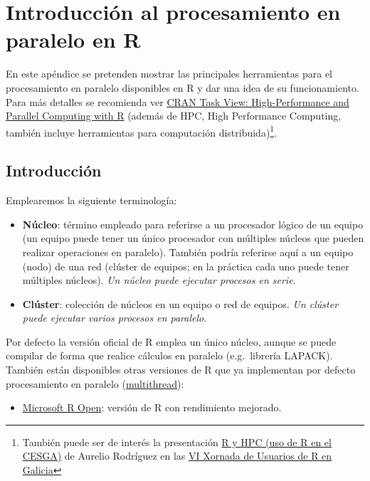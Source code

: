 \documentclass[
]{book}
\providecommand{\tightlist}{%
  \setlength{\itemsep}{0pt}\setlength{\parskip}{0pt}}
\theoremstyle{break}
\theoremstyle{nonumberplain}
\let\oldfootnote\footnote
\renewcommand\footnote[1]{\oldfootnote{\hspace{2mm}#1}}
\begin{document}
\chapter{Introducción al procesamiento en paralelo en R}\label{intro-hpc}

En este apéndice se pretenden mostrar las principales herramientas para el procesamiento en paralelo disponibles en R y dar una idea de su funcionamiento.
Para más detalles se recomienda ver \href{https://cran.r-project.org/view=HighPerformanceComputing}{CRAN Task View: High-Performance and Parallel Computing with R}
(además de HPC, High Performance Computing, también incluye herramientas
para computación distribuida)\footnote{También puede ser de interés la presentación \href{https://www.r-users.gal/sites/default/files/10_aurelio_rodriguez.pdf}{R y HPC (uso de R en el CESGA)} de Aurelio Rodríguez en las \href{https://www.r-users.gal/pagina/programa-2018}{VI Xornada de Usuarios de R en Galicia}}.

\section{Introducción}\label{introducciuxf3n}

Emplearemos la siguiente terminología:

\begin{itemize}
\item
  \textbf{Núcleo}: término empleado para referirse a un procesador lógico de un equipo
  (un equipo puede tener un único procesador con múltiples núcleos que pueden
  realizar operaciones en paralelo). También podría referirse aquí a un
  equipo (nodo) de una red (clúster de equipos; en la práctica cada uno puede tener
  múltiples núcleos). \emph{Un núcleo puede ejecutar procesos en serie}.
\item
  \textbf{Clúster}: colección de núcleos en un equipo o red de equipos.
  \emph{Un clúster puede ejecutar varios procesos en paralelo}.
\end{itemize}

Por defecto la versión oficial de R emplea un único núcleo, aunque se puede compilar
de forma que realice cálculos en paralelo (e.g.~librería LAPACK).
También están disponibles otras versiones de R que ya implementan por defecto
procesamiento en paralelo (\href{https://mran.revolutionanalytics.com/documents/rro/multithread}{multithread}):

\begin{itemize}
\tightlist
\item
  \href{https://mran.revolutionanalytics.com}{Microsoft R Open}: versión de R con rendimiento mejorado.
\end{itemize}
\end{document}
